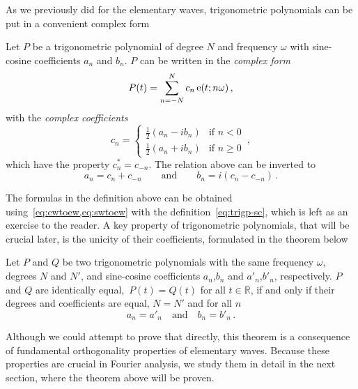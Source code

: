 As we previously did for the elementary waves, trigonometric polynomials can be put in a
convenient complex form
\begin{definition}
  \label{def:trigp-complex}
  Let $P$ be a trigonometric polynomial of degree $N$ and frequency $\omega$ with
  sine-cosine coefficients $a_n$ and $b_n$. $P$ can be written in the \emph{complex form}
  \begin{equation}
    P(t)=\sum_{n=-N}^{N}c_n\operatorname{e}(t;n\omega)\,,\label{eq:trigp-complex}
  \end{equation}
  with the \emph{complex coefficients}
  \begin{equation}
    c_n =
    \begin{cases}
      \frac{1}{2}(a_n-ib_n)&\text{if~}n< 0\\
      \frac{1}{2}(a_n+ib_n)&\text{if~}n\geq 0
    \end{cases}
    \,,\label{eq:ab-to-c}
  \end{equation}
  which have the property $c_n^*=c_{-n}$. The relation above can be inverted to
  \begin{equation}
    a_n=c_n+c_{-n}\qquad\text{and}\qquad
    b_n=i(c_n-c_{-n})\,.
  \end{equation}
\end{definition}
The formulas in the definition above can be obtained using~\cref{eq:cwtoew,eq:swtoew} with
the definition~\cref{eq:trigp-sc}, which is left as an exercise to the reader. A key
property of trigonometric polynomials, that will be crucial later, is the unicity of their
coefficients, formulated in the theorem below
\begin{theorem}
  \label{thm:trigp-unicity}
  Let $P$ and $Q$ be two trigonometric polynomials with the same frequency $\omega$,
  degrees $N$ and $N'$, and sine-cosine coefficients $a_n$,$b_n$ and $a'_n$,$b'_n$,
  respectively. $P$ and $Q$ are identically equal,~\ie $P(t)=Q(t)$ for all
  $t\in\mathbb{R}$, if and only if their degrees and coefficients are equal, \ie $N=N'$
  and for all $n$
  \begin{equation}
    a_n=a'_n\quad\text{and}\quad b_n=b'_n\,.
  \end{equation}
\end{theorem}
Although we could attempt to prove that directly, this theorem is a consequence of
fundamental orthogonality properties of elementary waves. Because these properties are
crucial in Fourier analysis, we  study them in detail in the next section, where the
theorem above will be proven.

